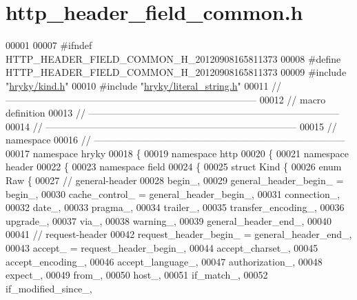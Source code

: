 \hypertarget{http__header__field__common_8h_source}{\section{http\-\_\-header\-\_\-field\-\_\-common.\-h}
}

\begin{DoxyCode}
00001 
00007 \textcolor{preprocessor}{#ifndef HTTP\_HEADER\_FIELD\_COMMON\_H\_20120908165811373}
00008 \textcolor{preprocessor}{}\textcolor{preprocessor}{#define HTTP\_HEADER\_FIELD\_COMMON\_H\_20120908165811373}
00009 \textcolor{preprocessor}{}\textcolor{preprocessor}{#include "\hyperlink{kind_8h}{hryky/kind.h}"}
00010 \textcolor{preprocessor}{#include "\hyperlink{literal__string_8h}{hryky/literal_string.h}"}
00011 \textcolor{comment}{//
      ------------------------------------------------------------------------------}
00012 \textcolor{comment}{// macro definition}
00013 \textcolor{comment}{//
      ------------------------------------------------------------------------------}
00014 \textcolor{comment}{//
      ------------------------------------------------------------------------------}
00015 \textcolor{comment}{// namespace}
00016 \textcolor{comment}{//
      ------------------------------------------------------------------------------}
00017 \textcolor{keyword}{namespace }hryky
00018 \{
00019 \textcolor{keyword}{namespace }http
00020 \{
00021 \textcolor{keyword}{namespace }header
00022 \{
00023 \textcolor{keyword}{namespace }field
00024 \{
00025     \textcolor{keyword}{struct }Kind \{
00026         \textcolor{keyword}{enum} Raw \{
00027             \textcolor{comment}{// general-header}
00028             begin\_,
00029             general\_header\_begin\_   = begin\_,
00030             cache\_control\_          = general\_header\_begin\_,
00031             connection\_,
00032             date\_,
00033             pragma\_,
00034             trailer\_,
00035             transfer\_encoding\_,
00036             upgrade\_,
00037             via\_,
00038             warning\_,
00039             general\_header\_end\_,
00040 
00041             \textcolor{comment}{// request-header}
00042             request\_header\_begin\_   = general\_header\_end\_,
00043             accept\_                 = request\_header\_begin\_,
00044             accept\_charset\_,
00045             accept\_encoding\_,
00046             accept\_language\_,
00047             authorization\_,
00048             expect\_,
00049             from\_,
00050             host\_,
00051             if\_match\_,
00052             if\_modified\_since\_,

\end{DoxyCode}
